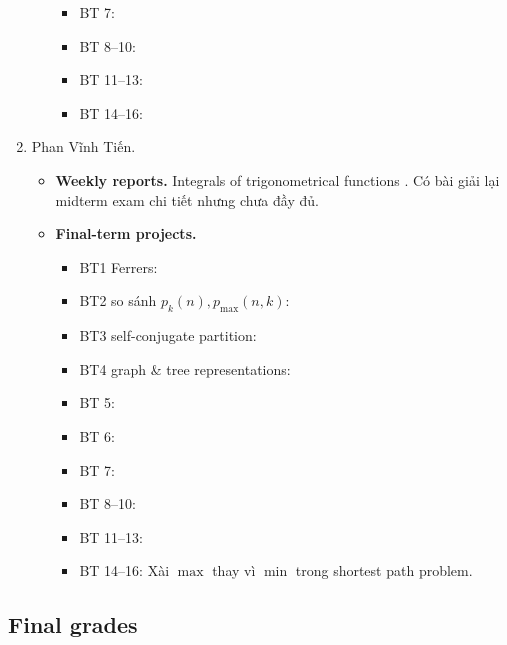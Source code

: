 \documentclass{article}
\begin{document}
\begin{enumerate}
\begin{itemize}
\begin{itemize}
            \item BT 7:
            \item BT 8--10:
            \item BT 11--13:
            \item BT 14--16:
        \end{itemize}
    \end{itemize}
    \item {\sc Phan Vĩnh Tiến.}
    \begin{itemize}
        \item {\bf Weekly reports.} Integrals of trigonometrical functions . Có bài giải lại midterm exam chi tiết nhưng chưa đầy đủ.
        \item {\bf Final-term projects.}
        \begin{itemize}
            \item BT1 Ferrers:
            \item BT2 so sánh $p_k(n),p_{\max}(n,k)$:
            \item BT3 self-conjugate partition:
            \item BT4 graph \& tree representations:
            \item BT 5:
            \item BT 6:
            \item BT 7:
            \item BT 8--10:
            \item BT 11--13:
            \item BT 14--16: Xài $\max$ thay vì $\min$ trong shortest path problem.
        \end{itemize}
    \end{itemize}
\end{enumerate}


\subsection{Final grades}
\end{document}
